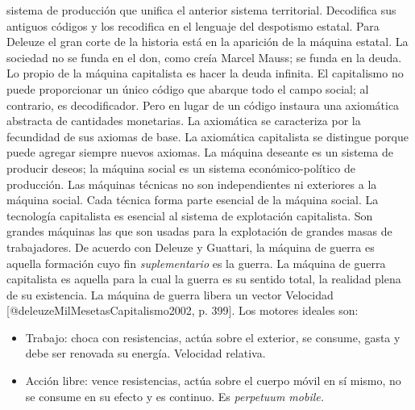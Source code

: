 \documentclass[
]{article}
\providecommand{\tightlist}{%
  \setlength{\itemsep}{0pt}\setlength{\parskip}{0pt}}
\begin{document}
sistema de producción que unifica el anterior sistema territorial.
Decodifica sus antiguos códigos y los recodifica en el lenguaje del
despotismo estatal. Para Deleuze el gran corte de la historia está en la
aparición de la máquina estatal. La sociedad no se funda en el don, como
creía Marcel Mauss; se funda en la deuda. Lo propio de la máquina
capitalista es hacer la deuda infinita. El capitalismo no puede
proporcionar un único código que abarque todo el campo social; al
contrario, es decodificador. Pero en lugar de un código instaura una
axiomática abstracta de cantidades monetarias. La axiomática se
caracteriza por la fecundidad de sus axiomas de base. La axiomática
capitalista se distingue porque puede agregar siempre nuevos axiomas. La
máquina deseante es un sistema de producir deseos; la máquina social es
un sistema económico-político de producción. Las máquinas técnicas no
son independientes ni exteriores a la máquina social. Cada técnica forma
parte esencial de la máquina social. La tecnología capitalista es
esencial al sistema de explotación capitalista. Son grandes máquinas las
que son usadas para la explotación de grandes masas de trabajadores. De
acuerdo con Deleuze y Guattari, la máquina de guerra es aquella
formación cuyo fin \emph{suplementario} es la guerra. La máquina de
guerra capitalista es aquella para la cual la guerra es su sentido
total, la realidad plena de su existencia. La máquina de guerra libera
un vector Velocidad {[}@deleuzeMilMesetasCapitalismo2002, p. 399{]}. Los
motores ideales son:

\begin{itemize}
\tightlist
\item
  Trabajo: choca con resistencias, actúa sobre el exterior, se consume,
  gasta y debe ser renovada su energía. Velocidad relativa.
\item
  Acción libre: vence resistencias, actúa sobre el cuerpo móvil en sí
  mismo, no se consume en su efecto y es continuo. Es \emph{perpetuum
  mobile.}
\end{itemize}
\end{document}
